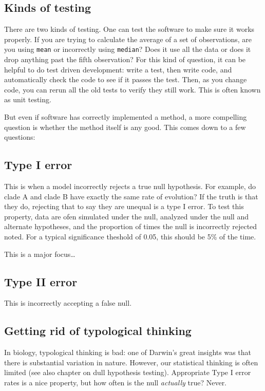 \documentclass[]{book}
\theoremstyle{definition}
\theoremstyle{definition}
\theoremstyle{remark}
\begin{document}
\subsection{Kinds of testing}\label{kinds-of-testing}

There are two kinds of testing. One can test the software to make sure
it works properly. If you are trying to calculate the average of a set
of observations, are you using \texttt{mean} or incorrectly using
\texttt{median}? Does it use all the data or does it drop anything past
the fifth observation? For this kind of question, it can be helpful to
do test driven development: write a test, then write code, and
automatically check the code to see if it passes the test. Then, as you
change code, you can rerun all the old tests to verify they still work.
This is often known as unit testing.

But even if software has correctly implemented a method, a more
compelling question is whether the method itself is any good. This comes
down to a few questions:

\subsection{Type I error}\label{type-i-error}

This is when a model incorrectly rejects a true null hypothesis. For
example, do clade A and clade B have exactly the same rate of evolution?
If the truth is that they do, rejecting that to say they are unequal is
a type I error. To test this property, data are ofen simulated under the
null, analyzed under the null and alternate hypotheses, and the
proportion of times the null is incorrectly rejected noted. For a
typical significance theshold of 0.05, this should be 5\% of the time.

This is a major focus\ldots{}

\subsection{Type II error}\label{type-ii-error}

This is incorrectly accepting a false null.

\subsection{Getting rid of typological
thinking}\label{getting-rid-of-typological-thinking}

In biology, typological thinking is bad: one of Darwin's great insights
was that there is substantial variation in nature. However, our
statistical thinking is often limited (see also chapter on dull
hypothesis testing). Appropriate Type I error rates is a nice property,
but how often is the null \emph{actually} true? Never.
\end{document}
